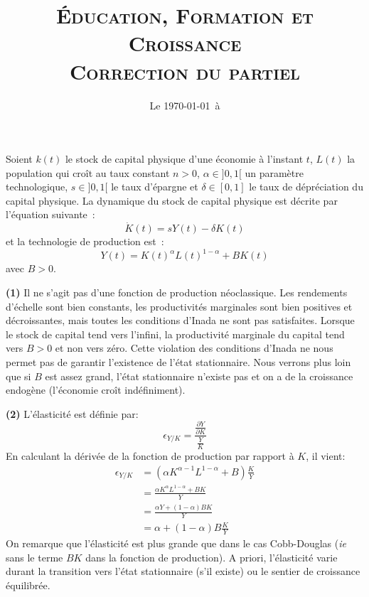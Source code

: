 \documentclass[10pt,a4paper,notitlepage]{article}
\newcommand{\question}[1]{\textbf{(#1)}}
\begin{document}
\title{\textsc{Éducation, Formation et Croissance\\ \small{Correction
      du partiel}}}
\date{Le \today\ à \thistime}

\maketitle

Soient $k(t)$ le stock de capital physique d'une économie à l'instant
$t$, $L(t)$ la population qui croît au taux constant $n>0$,
$\alpha\in]0,1[$ un paramètre technologique, $s\in]0,1[$ le taux
d'épargne et $\delta\in[0,1]$ le taux de dépréciation du capital
physique. La dynamique du stock de capital physique est décrite par
l'équation suivante :
\[
\dot K(t) = sY(t)-\delta K(t)
\]
et la technologie de production est :
\[
Y(t) = K(t)^\alpha L(t)^{1-\alpha} + BK(t)
\]
avec $B>0$.\newline

\bigskip
\bigskip

\question{1} Il ne s'agit pas d'une fonction de production
néoclassique. Les rendements d'échelle sont bien constants, les
productivités marginales sont bien positives et décroissantes, mais
toutes les conditions d'Inada ne sont pas satisfaites. Lorsque le
stock de capital tend vers l'infini, la productivité marginale du
capital tend vers $B>0$ et non vers zéro. Cette violation des
conditions d'Inada ne nous permet pas de garantir l'existence de
l'état stationnaire. Nous verrons plus loin que si $B$ est assez
grand, l'état stationnaire n'existe pas et on a de la croissance
endogène (l'économie croît indéfiniment).\newline

\question{2} L'élasticité est définie par:
\[
\epsilon_{Y/K} = \frac{\frac{\partial Y}{\partial K}}{\frac{Y}{K}}
\]
En calculant la dérivée de la fonction de production par rapport à
$K$, il vient:
\[
\begin{split}
  \epsilon_{Y/K} &= \left(\alpha
    K^{\alpha-1}L^{1-\alpha}+B\right)\frac{K}{Y}\\
  &= \frac{\alpha K^{\alpha}L^{1-\alpha}+BK}{Y}\\
  &= \frac{\alpha Y +(1-\alpha)BK}{Y}\\
  &= \alpha + (1-\alpha)B \frac{K}{Y}
\end{split}
\]
On remarque que l'élasticité est plus grande que dans le cas
Cobb-Douglas (\emph{ie} sans le terme $BK$ dans la fonction de
production). A priori, l'élasticité varie durant la transition vers
l'état stationnaire (s'il existe) ou le sentier de croissance
équilibrée.\newline
\end{document}
